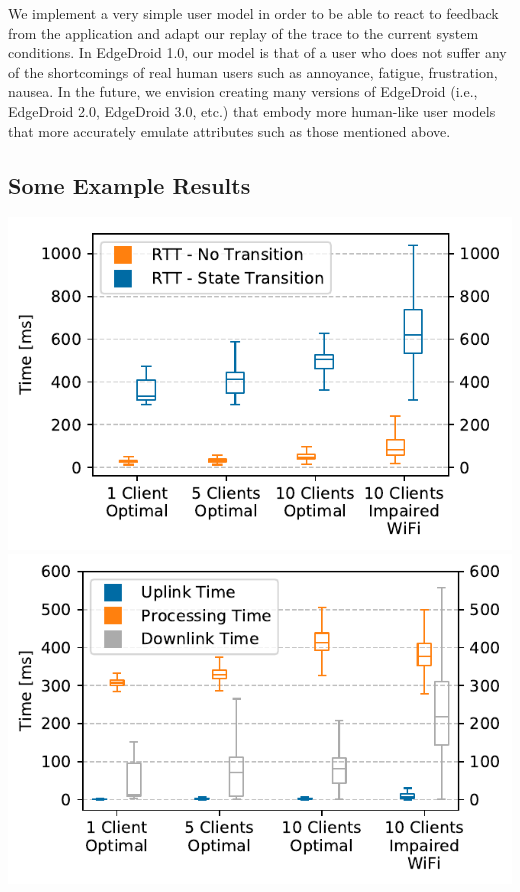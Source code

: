 \documentclass[portrait, a1]{KTHEEposter}
\begin{document}
\begin{pcolumns}[3]
\begin{pcolumn}[2]
\begin{pframe}[1.1]
            We implement a very simple user model in order to be able to react to feedback from the application and adapt our replay of the trace to the current system conditions.
            In EdgeDroid 1.0, our model is that of a user who does not suffer any of the shortcomings of real human users such as annoyance, fatigue, frustration, nausea.            
            In the future, we envision creating  many versions of EdgeDroid (i.e., EdgeDroid 2.0, EdgeDroid 3.0, etc.) that embody more human-like user models that more accurately emulate attributes such as those mentioned above. 
        \end{pframe}%
    \end{pcolumn}%
    \begin{pcolumn}[2]
        \begin{pframe}[1.55]
            \section{Some Example Results}
            \begin{center}
                \medskip
                \includegraphics[width=\linewidth]{plots/comparison/rtt_fb_vs_nofb.pdf}
                \medskip
                \includegraphics[width=\linewidth]{plots/comparison/box_feedback.pdf}

\end{center}
\end{pframe}
\end{pcolumn}
\end{pcolumns}
\end{document}
